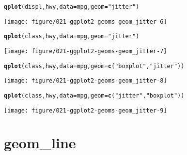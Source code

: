 \documentclass[a4paper,titlepage]{tufte-handout}\usepackage[]{graphicx}\usepackage[]{color}
\makeatletter
\def\maxwidth{ %
  \ifdim\Gin@nat@width>\linewidth
    \linewidth
  \else
    \Gin@nat@width
  \fi
}
\newcommand{\hlstr}[1]{\textcolor[rgb]{0.192,0.494,0.8}{#1}}%
\newcommand{\hlstd}[1]{\textcolor[rgb]{0.345,0.345,0.345}{#1}}%
\newcommand{\hlkwc}[1]{\textcolor[rgb]{0.333,0.667,0.333}{#1}}%
\newcommand{\hlkwd}[1]{\textcolor[rgb]{0.737,0.353,0.396}{\textbf{#1}}}%
\newenvironment{kframe}{%
 \def\at@end@of@kframe{}%
 \ifinner\ifhmode%
  \def\at@end@of@kframe{\end{minipage}}%
  \begin{minipage}{\columnwidth}%
 \fi\fi%
 \def\FrameCommand##1{\hskip\@totalleftmargin \hskip-\fboxsep
 \colorbox{shadecolor}{##1}\hskip-\fboxsep
     \hskip-\linewidth \hskip-\@totalleftmargin \hskip\columnwidth}%
 \MakeFramed {\advance\hsize-\width
   \@totalleftmargin\z@ \linewidth\hsize
   \@setminipage}}%
 {\par\unskip\endMakeFramed%
 \at@end@of@kframe}
\newenvironment{knitrout}{}{} %
\makeatother
\begin{document}
\begin{knitrout}
\begin{kframe}
\begin{alltt}
\hlkwd{qplot}\hlstd{(displ, hwy,} \hlkwc{data} \hlstd{= mpg,} \hlkwc{geom} \hlstd{=} \hlstr{"jitter"}\hlstd{)}
\end{alltt}
\end{kframe}
\texttt{[image: figure/021-ggplot2-geoms-geom\_jitter-6]} 
\begin{kframe}\begin{alltt}
\hlkwd{qplot}\hlstd{(class, hwy,} \hlkwc{data} \hlstd{= mpg,} \hlkwc{geom} \hlstd{=} \hlstr{"jitter"}\hlstd{)}
\end{alltt}
\end{kframe}
\texttt{[image: figure/021-ggplot2-geoms-geom\_jitter-7]} 
\begin{kframe}\begin{alltt}
\hlkwd{qplot}\hlstd{(class, hwy,} \hlkwc{data} \hlstd{= mpg,} \hlkwc{geom} \hlstd{=} \hlkwd{c}\hlstd{(}\hlstr{"boxplot"}\hlstd{,} \hlstr{"jitter"}\hlstd{))}
\end{alltt}
\end{kframe}
\texttt{[image: figure/021-ggplot2-geoms-geom\_jitter-8]} 
\begin{kframe}\begin{alltt}
\hlkwd{qplot}\hlstd{(class, hwy,} \hlkwc{data} \hlstd{= mpg,} \hlkwc{geom} \hlstd{=} \hlkwd{c}\hlstd{(}\hlstr{"jitter"}\hlstd{,} \hlstr{"boxplot"}\hlstd{))}
\end{alltt}
\end{kframe}
\texttt{[image: figure/021-ggplot2-geoms-geom\_jitter-9]} 

\end{knitrout}


\section{geom\_line}
\end{document}
